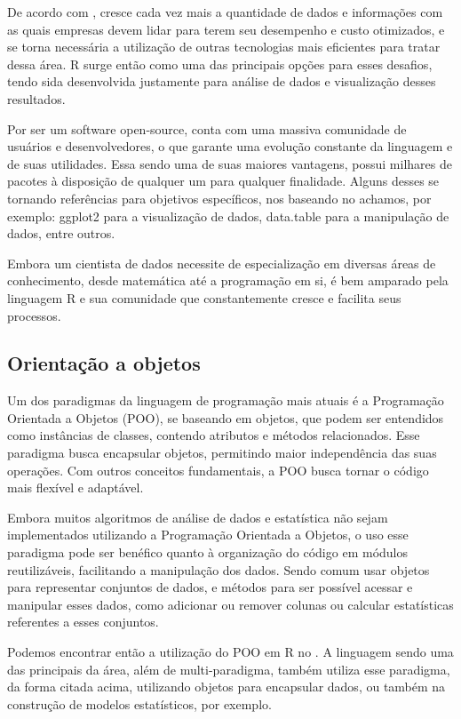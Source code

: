         De acordo com \cite{Kabacoff2015}, cresce cada vez mais a quantidade de dados e informações com as quais empresas devem lidar para terem seu desempenho e custo otimizados, e se torna necessária a utilização de outras tecnologias mais eficientes para tratar dessa área. R surge então como uma das principais opções para esses desafios, tendo sida desenvolvida justamente para análise de dados e visualização desses resultados.  
        
        Por ser um software open-source, conta com uma massiva comunidade de usuários e desenvolvedores, o que garante uma evolução constante da linguagem e de suas utilidades. Essa sendo uma de suas maiores vantagens, possui milhares de pacotes à disposição de qualquer um para qualquer finalidade. Alguns desses se tornando referências para objetivos específicos, nos baseando no \cite{Wickham2016} achamos, por exemplo: ggplot2 para a visualização de dados, data.table para a manipulação de dados, entre outros.
        
        Embora um cientista de dados necessite de especialização em diversas áreas de conhecimento, desde matemática até a programação em si, é bem amparado pela linguagem R e sua comunidade que constantemente cresce e facilita seus processos.

        \subsection{ Orienta\c{c}\~{a}o a objetos}
        Um dos paradigmas da linguagem de programação mais atuais é a Programação Orientada a Objetos (POO), se baseando em objetos, que podem ser entendidos como instâncias de classes, contendo atributos e métodos relacionados. Esse paradigma busca encapsular objetos, permitindo maior independência das suas operações. Com outros conceitos fundamentais, a POO busca tornar o código mais flexível e adaptável. \cite{Deitel2018}
        
        Embora muitos algoritmos de análise de dados e estatística não sejam implementados utilizando a Programação Orientada a Objetos, o uso esse paradigma pode ser benéfico quanto à organização do código em módulos reutilizáveis, facilitando a manipulação dos dados. Sendo comum usar objetos para representar conjuntos de dados, e métodos para ser possível acessar e manipular esses dados, como adicionar ou remover colunas ou calcular estatísticas referentes a esses conjuntos.
        
        Podemos encontrar então a utilização do POO em R no \cite{Mailund2017}. A linguagem sendo uma das principais da área, além de multi-paradigma, também utiliza esse paradigma, da forma citada acima, utilizando objetos para encapsular dados, ou também na construção de modelos estatísticos, por exemplo. 
        
